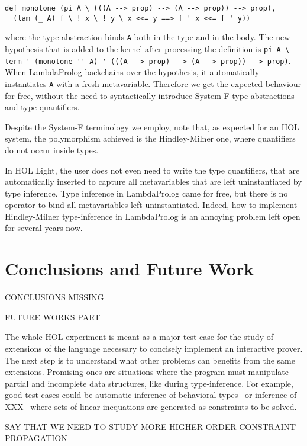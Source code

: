 \documentclass[preprint]{sigplanconf}
\begin{document}
\begin{verbatim}
def monotone (pi A \ (((A --> prop) --> (A --> prop)) --> prop),
  (lam (_ A) f \ ! x \ ! y \ x <<= y ==> f ' x <<= f ' y))
\end{verbatim}

where the type abstraction binds \verb+A+ both in the type and in the body.
The new hypothesis that is added to the kernel after processing the definition
is \verb+pi A \ term ' (monotone '' A) ' (((A --> prop) --> (A --> prop)) --> prop)+. When LambdaProlog backchains over the hypothesis, it automatically instantiates \verb+A+ with a fresh metavariable. Therefore we get the expected behaviour for free, without the need to syntactically introduce System-F type abstractions and type quantifiers.

Despite the System-F terminology we employ, note that, as expected for an HOL system, the polymorphism achieved is the Hindley-Milner one, where quantifiers do not occur inside types.

In HOL Light, the user does not even need to write the type quantifiers, that
are automatically inserted to capture all metavariables that are left uninstantiated by type inference. Type inference in LambdaProlog came for free, but there is no operator to bind all metavariables left uninstantiated. Indeed, how to implement Hindley-Milner type-inference in LambdaProlog is an annoying problem left open for several years now.

\section{Conclusions and Future Work}

CONCLUSIONS MISSING

FUTURE WORKS PART

The whole HOL experiment is meant as a major test-case for the study of extensions of the language necessary to concisely implement an interactive prover. The next step is to understand what other problems can benefits from the same extensions. Promising ones are situations where the program must manipulate partial and incomplete data structures, like during type-inference. For example, good test cases could be automatic inference of behavioral types~\cite{cosimo1} or inference of XXX~\cite{baillot1} where sets of linear inequations are generated as constraints to be solved.

SAY THAT WE NEED TO STUDY MORE HIGHER ORDER CONSTRAINT PROPAGATION
\end{document}
